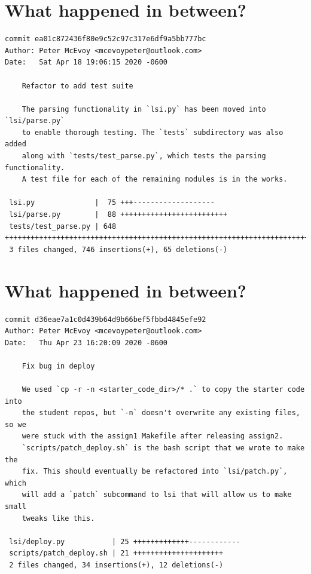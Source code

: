 \documentclass{article}
\begin{document}
\section*{What happened in between?}
\vspace{2ex}
\begin{verbatim}
commit ea01c872436f80e9c52c97c317e6df9a5bb777bc
Author: Peter McEvoy <mcevoypeter@outlook.com>
Date:   Sat Apr 18 19:06:15 2020 -0600

    Refactor to add test suite
    
    The parsing functionality in `lsi.py` has been moved into `lsi/parse.py`
    to enable thorough testing. The `tests` subdirectory was also added
    along with `tests/test_parse.py`, which tests the parsing functionality.
    A test file for each of the remaining modules is in the works.

 lsi.py              |  75 +++-------------------
 lsi/parse.py        |  88 +++++++++++++++++++++++++
 tests/test_parse.py | 648 ++++++++++++++++++++++++++++++++++++++++++++++++++++++++++++++++++++++++++++++++++++++++++++++++++++++++++++++++++++++++++++++++++++++++++++++++++++++++++++++++++++++++++++++++++++++++
 3 files changed, 746 insertions(+), 65 deletions(-)

\end{verbatim}

\newpage

\section*{What happened in between?}
\vspace{2ex}
\begin{verbatim}
commit d36eae7a1c0d439b64d9b66bef5fbbd4845efe92
Author: Peter McEvoy <mcevoypeter@outlook.com>
Date:   Thu Apr 23 16:20:09 2020 -0600

    Fix bug in deploy
    
    We used `cp -r -n <starter_code_dir>/* .` to copy the starter code into
    the student repos, but `-n` doesn't overwrite any existing files, so we
    were stuck with the assign1 Makefile after releasing assign2.
    `scripts/patch_deploy.sh` is the bash script that we wrote to make the
    fix. This should eventually be refactored into `lsi/patch.py`, which
    will add a `patch` subcommand to lsi that will allow us to make small
    tweaks like this.

 lsi/deploy.py           | 25 +++++++++++++------------
 scripts/patch_deploy.sh | 21 +++++++++++++++++++++
 2 files changed, 34 insertions(+), 12 deletions(-)

\end{verbatim}
\end{document}
